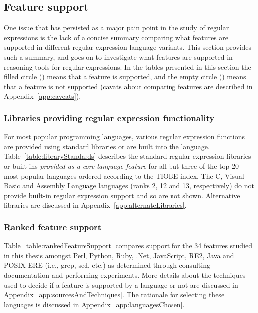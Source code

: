 \subsection{Feature support}
\label{sec:featureSupport}



One issue that has persisted as a major pain point in the study of regular expressions is the lack of a concise summary comparing what features are supported in different regular expression language variants.  This section provides such a summary, and goes on to investigate what features are supported in reasoning tools for regular expressions.  In the tables presented in this section the filled circle (\yes) means that a feature is supported, and the empty circle (\no) means that a feature is not supported (cavats about comparing features are described in Appendix~\ref{app:caveats}).

\subsubsection{Libraries providing regular expression functionality}
For most popular programming languages, various regular expression functions are provided using standard libraries or are built into the language.  Table~\ref{table:libraryStandards} describes the standard regular expression libraries or built-ins \emph{provided as a core language feature} for all but three of the top 20 most popular languages ordered according to the TIOBE index. The C, Visual Basic and Assembly Language languages (ranks 2, 12 and 13, respectively) do not provide built-in regular expression support and so are not shown.  Alternative libraries are discussed in Appendix~\ref{app:alternateLibraries}.





\afterpage{\clearpage}

\subsubsection{Ranked feature support}
\label{sec:rankedFeatureSupport}
Table~\ref{table:rankedFeatureSupport} compares support for the 34 features studied in this thesis amongst Perl, Python, Ruby, .Net, JavaScript, RE2, Java and POSIX ERE (i.e., grep, sed, etc.) as determined through consulting documentation and performing experiments.  More details about the techniques used to decide if a feature is supported by a language or not are discussed in Appendix~\ref{app:sourcesAndTechniques}.  The rationale for selecting these languages is discussed in Appendix~\ref{app:languagesChosen}.

